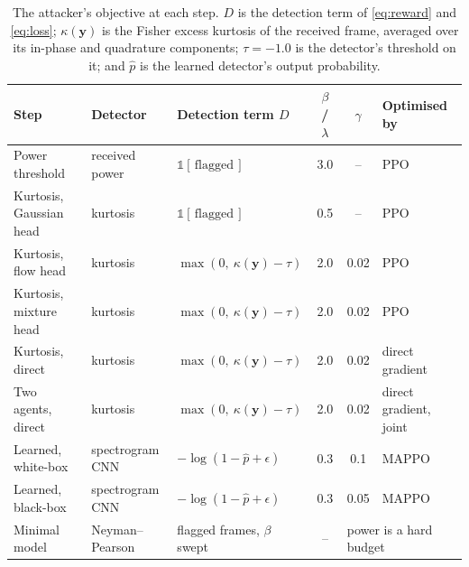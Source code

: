 \begin{table}[!t]
\renewcommand{\arraystretch}{1.3}
\caption{The attacker's objective at each step. $D$ is the detection term of \eqref{eq:reward} and \eqref{eq:loss}; $\kappa(\mathbf{y})$ is the Fisher excess kurtosis of the received frame, averaged over its in-phase and quadrature components; $\tau=-1.0$ is the detector's threshold on it; and $\hat{p}$ is the learned detector's output probability.}
\label{tab:objectives}
\centering
\begin{tabular}{l l l c c l}
\hline\hline
\textbf{Step} & \textbf{Detector} & \textbf{Detection term $D$} & \textbf{$\beta$ / $\lambda$} & \textbf{$\gamma$} & \textbf{Optimised by} \\
\hline
Power threshold        & received power      & $\mathbb{1}[\,\text{flagged}\,]$              & 3.0  & --   & PPO \\
Kurtosis, Gaussian head& kurtosis            & $\mathbb{1}[\,\text{flagged}\,]$              & 0.5  & --   & PPO \\
Kurtosis, flow head    & kurtosis            & $\max(0,\ \kappa(\mathbf{y}) - \tau)$         & 2.0  & 0.02 & PPO \\
Kurtosis, mixture head & kurtosis            & $\max(0,\ \kappa(\mathbf{y}) - \tau)$         & 2.0  & 0.02 & PPO \\
Kurtosis, direct       & kurtosis            & $\max(0,\ \kappa(\mathbf{y}) - \tau)$         & 2.0  & 0.02 & direct gradient \\
Two agents, direct     & kurtosis            & $\max(0,\ \kappa(\mathbf{y}) - \tau)$         & 2.0  & 0.02 & direct gradient, joint \\
Learned, white-box     & spectrogram CNN     & $-\log(1 - \hat{p} + \epsilon)$               & 0.3  & 0.1  & MAPPO \\
Learned, black-box     & spectrogram CNN     & $-\log(1 - \hat{p} + \epsilon)$               & 0.3  & 0.05 & MAPPO \\
\hline
Minimal model          & Neyman--Pearson     & flagged frames, $\beta$ swept                 & --   & \multicolumn{2}{l}{power is a hard budget} \\
\hline\hline
\end{tabular}
\end{table}
